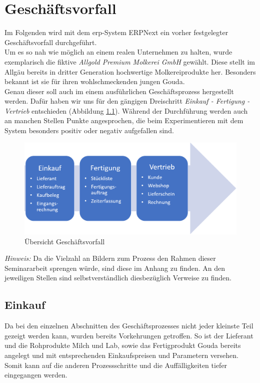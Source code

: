 \chapter{Geschäftsvorfall}
\label{chap:vorfall}
Im Folgenden wird mit dem \gls{erp}-System ERPNext ein vorher festgelegter Geschäftsvorfall durchgeführt. \\
Um es so nah wie möglich an einem realen Unternehmen zu halten, wurde exemplarisch die fiktive \emph{Allgold Premium Molkerei GmbH} gewählt. Diese stellt im Allgäu bereits in dritter Generation hochwertige Molkereiprodukte her. Besonders bekannt ist sie für ihren wohlschmeckenden jungen Gouda.\\
Genau dieser soll auch im einem ausführlichen Geschäftsprozess hergestellt werden. Dafür haben wir uns für den gängigen Dreischritt \emph{Einkauf - Fertigung - Vertrieb} entschieden (\vgl Abbildung \ref{fig:geschVorfall}). Während der Durchführung werden auch an manchen Stellen Punkte angesprochen, die beim Experimentieren mit dem System besonders positiv oder negativ aufgefallen sind.
\begin{figure}[H]
  \centering
  \includegraphics[width=\textwidth]{Bilder/Geschaeftsvorfall.PNG}
  \caption{Übersicht Geschäftsvorfall}
  \label{fig:geschVorfall}
\end{figure}
\emph{Hinweis:} Da die Vielzahl an Bildern zum Prozess den Rahmen dieser Seminararbeit sprengen würde, sind diese im Anhang zu finden. An den jeweiligen Stellen sind selbstverständlich diesbezüglich Verweise zu finden.

\section{Einkauf}
Da bei den einzelnen Abschnitten des Geschäftsprozesses nicht jeder kleinste Teil gezeigt werden kann, wurden bereits Vorkehrungen getroffen. So ist der Lieferant und die Rohprodukte Milch und Lab, sowie das Fertigprodukt Gouda bereits angelegt und mit entsprechenden Einkaufspreisen und Parametern versehen. Somit kann auf die anderen Prozessschritte und die Auffälligkeiten tiefer eingegangen werden.

